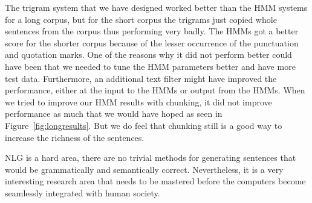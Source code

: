\documentclass[a4paper,12pt]{article}
\begin{document}
The trigram system that we have designed worked better than the HMM systems for
a long corpus, but for the short corpus the trigrams just copied whole sentences
from the corpus thus performing very badly. The HMMs got a better score for the
shorter corpus because of the lesser occurrence of the punctuation and quotation
marks.
One of the reasons why it did not perform better could have been that we needed
to tune the HMM parameters better and have more test data. Furthermore, an
additional text filter might have improved the performance, either at the input
to the HMMs or output from the HMMs.
When we tried to improve our HMM results with chunking, it did not improve
performance as much that we would have hoped as seen in
Figure~\ref{fig:longresults}. But we do feel that chunking still is a good way
to increase the richness of the sentences.

NLG is a hard area, there are no trivial methods for generating sentences that
would be grammatically and semantically correct.
Nevertheless, it is a very interesting research area that needs to be mastered
before the computers become seamlessly integrated with human society.
\label{sec:summary}



\end{document}
